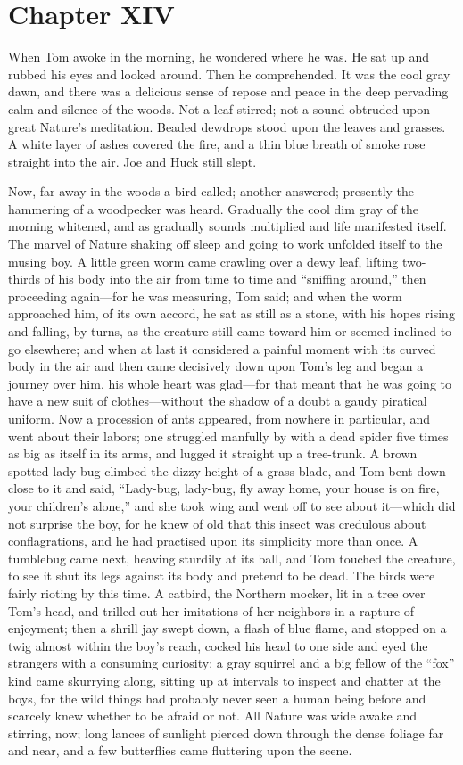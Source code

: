 \documentclass{book}
\begin{document}
\chapter*{Chapter XIV}

When Tom awoke in the morning, he wondered where he was. He sat up and rubbed his eyes and looked around. Then he comprehended. It was the cool gray dawn, and there was a delicious sense of repose and peace in the deep pervading calm and silence of the woods. Not a leaf stirred; not a sound obtruded upon great Nature’s meditation. Beaded dewdrops stood upon the leaves and grasses. A white layer of ashes covered the fire, and a thin blue breath of smoke rose straight into the air. Joe and Huck still slept.

Now, far away in the woods a bird called; another answered; presently the hammering of a woodpecker was heard. Gradually the cool dim gray of the morning whitened, and as gradually sounds multiplied and life manifested itself. The marvel of Nature shaking off sleep and going to work unfolded itself to the musing boy. A little green worm came crawling over a dewy leaf, lifting two-thirds of his body into the air from time to time and “sniffing around,” then proceeding again—for he was measuring, Tom said; and when the worm approached him, of its own accord, he sat as still as a stone, with his hopes rising and falling, by turns, as the creature still came toward him or seemed inclined to go elsewhere; and when at last it considered a painful moment with its curved body in the air and then came decisively down upon Tom’s leg and began a journey over him, his whole heart was glad—for that meant that he was going to have a new suit of clothes—without the shadow of a doubt a gaudy piratical uniform. Now a procession of ants appeared, from nowhere in particular, and went about their labors; one struggled manfully by with a dead spider five times as big as itself in its arms, and lugged it straight up a tree-trunk. A brown spotted lady-bug climbed the dizzy height of a grass blade, and Tom bent down close to it and said, “Lady-bug, lady-bug, fly away home, your house is on fire, your children’s alone,” and she took wing and went off to see about it—which did not surprise the boy, for he knew of old that this insect was credulous about conflagrations, and he had practised upon its simplicity more than once. A tumblebug came next, heaving sturdily at its ball, and Tom touched the creature, to see it shut its legs against its body and pretend to be dead. The birds were fairly rioting by this time. A catbird, the Northern mocker, lit in a tree over Tom’s head, and trilled out her imitations of her neighbors in a rapture of enjoyment; then a shrill jay swept down, a flash of blue flame, and stopped on a twig almost within the boy’s reach, cocked his head to one side and eyed the strangers with a consuming curiosity; a gray squirrel and a big fellow of the “fox” kind came skurrying along, sitting up at intervals to inspect and chatter at the boys, for the wild things had probably never seen a human being before and scarcely knew whether to be afraid or not. All Nature was wide awake and stirring, now; long lances of sunlight pierced down through the dense foliage far and near, and a few butterflies came fluttering upon the scene.
\end{document}
